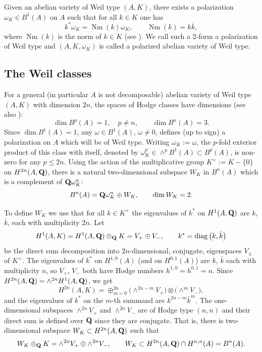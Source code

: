 \documentclass[10pt,a4paper]{amsart}
\numberwithin{equation}{section}
\begin{document}
Given an abelian variety of Weil type $(A,K)$,
there exists a polarization $\omega_K\in B^1(A)$ on $A$
such that for all $k\in K$ one has
\[
k^*\omega_K = \operatorname{Nm}(k)\omega_K,\qquad \operatorname{Nm}(k) = k\bar{k},
\]
where $\operatorname{Nm}(k)$ is the norm of $k\in K$ (see \cite[Lemma 5.2.1]{hcav}).
We call such a 2-form a polarization of Weil type and
$(A,K,\omega_K)$ is called a polarized abelian variety of Weil type.

\subsection{The Weil classes}
For a general (in particular $A$ is not decomposable) abelian variety of Weil type
$(A,K)$ with dimension $2n$, the spaces of Hodge classes have dimensions
\cite{Weil} (see also \cite[Theorem~6.12]{hcav}):
\[
\dim B^p(A) = 1,\quad p\ne n,\qquad \dim B^n(A) = 3.
\]
Since $\dim B^1(A)=1$, any $\omega\in B^1(A)$, $\omega\ne 0$,
defines (up to sign) a polarization on $A$ which will be of Weil type.
Writing $\omega_K:=\omega$, the $p$-fold exterior product of this class with itself,
denoted by $\omega_K^p\in \wedge^pB^1(A)\subset B^p(A)$, is non-zero
for any $p\leq 2n$.
Using the action of the multiplicative group $K^\times:=K-\{0\}$ on $H^{2n}(A,{\bf Q})$,
there is a natural two-dimensional subspace $W_K$
in $B^n(A)$ which is a complement of ${\bf Q}\omega_K^n$:
\[
B^n(A) = {\bf Q}\omega_K^n \oplus W_K,\qquad \dim W_K = 2.
\]

To define $W_K$ we use that for all $k\in K^\times$
the eigenvalues of $k^*$ on $H^1(A,{\bf Q})$ are $k$, $\bar{k}$,
each with multiplicity $2n$. Let
\[
H^1(A,K)=H^1(A,{\bf Q})\otimes_{\bf Q} K=V_+\oplus V_-,\qquad k^* = \operatorname{diag}\big(k,\bar{k}\big)
\]
be the direct sum decomposition into $2n$-dimensional, conjugate, eigenspaces
$V_\pm$ of $K^\times$.
The eigenvalues of $k^*$ on $H^{1,0}(A)$ (and on $H^{0,1}(A)$) are $k$, $\bar{k}$ each with
multiplicity $n$,
so $V_+$, $V_-$ both have Hodge numbers $h^{1,0}=h^{0,1}=n$.
Since $H^{2n}(A,{\bf Q})=\wedge^{2n}H^1(A,{\bf Q})$, we get
\[
H^{2n}(A,K) = \oplus_{m=0}^{2n} \big({\wedge}^{2n-m}V_+\big)\otimes\big({\wedge}^mV_-\big),
\]
and the eigenvalues of $k^*$ on the $m$-th summand are $k^{2n-m}\bar{k}^m$.
The one-dimensional subspaces $\wedge^{2n}V_+$ and $\wedge^{2n}V_-$
are of Hodge type $(n,n)$
and their direct sum is defined over ${\bf Q}$ since they are conjugate.
That is, there is two-dimensional subspace $W_K\subset H^{2n}(A,{\bf Q})$ such that
\[
W_K\otimes_{\bf Q} K = \wedge^{2n}V_+ \oplus \wedge^{2n}V_-,\qquad
W_K\subset H^{2n}(A,{\bf Q})\cap H^{n,n}(A) = B^n(A).
\]
\end{document}
